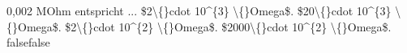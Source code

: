     {0,002 MOhm entspricht ...}
    {\$2\textbackslash\{\}cdot 10\textasciicircum{}\{3\} \textbackslash\{\}Omega\$.}
    {\$20\textbackslash\{\}cdot 10\textasciicircum{}\{3\} \textbackslash\{\}Omega\$.}
    {\$2\textbackslash\{\}cdot 10\textasciicircum{}\{2\} \textbackslash\{\}Omega\$.}
    {\$2000\textbackslash\{\}cdot 10\textasciicircum{}\{2\} \textbackslash\{\}Omega\$.}
    {false}{false}